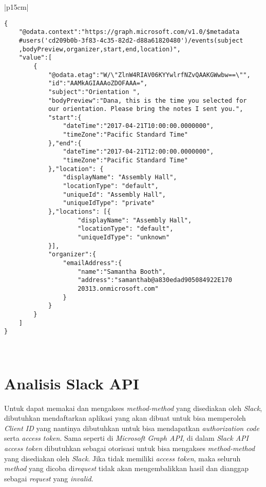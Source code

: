 \begin{table}[H]
	\centering 
	\caption{Tabel contoh \textit{response event}}
	\label{tab:contoh_response_event}
	\begin{tabular}{|p{15cm}|}
	\toprule
	\begin{lstlisting}
{
    "@odata.context":"https://graph.microsoft.com/v1.0/$metadata
    #users('cd209b0b-3f83-4c35-82d2-d88a61820480')/events(subject
    ,bodyPreview,organizer,start,end,location)",
    "value":[
        {
            "@odata.etag":"W/\"ZlnW4RIAV06KYYwlrfNZvQAAKGWwbw==\"",
            "id":"AAMkAGIAAAoZDOFAAA=",
            "subject":"Orientation ",
            "bodyPreview":"Dana, this is the time you selected for 
            our orientation. Please bring the notes I sent you.",
            "start":{
                "dateTime":"2017-04-21T10:00:00.0000000",
                "timeZone":"Pacific Standard Time"
            },"end":{
                "dateTime":"2017-04-21T12:00:00.0000000",
                "timeZone":"Pacific Standard Time"
            },"location": {
                "displayName": "Assembly Hall",
                "locationType": "default",
                "uniqueId": "Assembly Hall",
                "uniqueIdType": "private"
            },"locations": [{
                    "displayName": "Assembly Hall",
                    "locationType": "default",
                    "uniqueIdType": "unknown"
            }],                
            "organizer":{
                "emailAddress":{
                    "name":"Samantha Booth",
                    "address":"samanthab@a830edad905084922E170
                    20313.onmicrosoft.com"
                }
            }
        }
    ]
}
\end{lstlisting}\\
	\bottomrule
	\end{tabular}  
\end{table}

\section{Analisis Slack API}
\label{sec:analisis_slack_api}
Untuk dapat memakai dan mengakses \textit{method-method} yang disediakan oleh \textit{Slack}, dibutuhkan mendaftarkan aplikasi yang akan dibuat untuk bisa memperoleh \textit{Client ID} yang nantinya dibutuhkan untuk bisa mendapatkan \textit{authorization code} serta \textit{access token}. Sama seperti di \textit{Microsoft Graph API}, di dalam \textit{Slack API access token} dibutuhkan sebagai otorisasi untuk bisa mengakses \textit{method-method} yang disediakan oleh \textit{Slack}. Jika tidak memiliki \textit{access token}, maka seluruh \textit{method} yang dicoba di\textit{request} tidak akan mengembalikkan hasil dan dianggap sebagai \textit{request} yang \textit{invalid}. 

